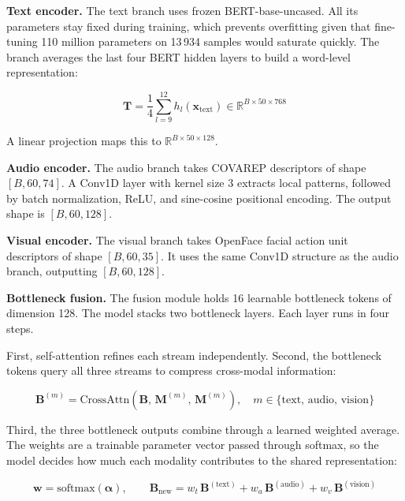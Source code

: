 

\textbf{Text encoder.} The text branch uses frozen BERT-base-uncased. All its parameters stay fixed during training, which prevents overfitting given that fine-tuning 110 million parameters on 13\,934 samples would saturate quickly. The branch averages the last four BERT hidden layers to build a word-level representation:

\begin{equation}
\mathbf{T} = \frac{1}{4} \sum_{l=9}^{12} h_l(\mathbf{x}_{\text{text}}) \in \mathbb{R}^{B \times 50 \times 768}
\end{equation}

A linear projection maps this to $\mathbb{R}^{B \times 50 \times 128}$.

\textbf{Audio encoder.} The audio branch takes COVAREP descriptors of shape $[B, 60, 74]$. A Conv1D layer with kernel size 3 extracts local patterns, followed by batch normalization, ReLU, and sine-cosine positional encoding. The output shape is $[B, 60, 128]$.

\textbf{Visual encoder.} The visual branch takes OpenFace facial action unit descriptors of shape $[B, 60, 35]$. It uses the same Conv1D structure as the audio branch, outputting $[B, 60, 128]$.

\textbf{Bottleneck fusion.} The fusion module holds 16 learnable bottleneck tokens of dimension 128. The model stacks two bottleneck layers. Each layer runs in four steps.

First, self-attention refines each stream independently. Second, the bottleneck tokens query all three streams to compress cross-modal information:

\begin{equation}
\mathbf{B}^{(m)} = \text{CrossAttn}(\mathbf{B},\, \mathbf{M}^{(m)},\, \mathbf{M}^{(m)}), \quad m \in \{\text{text, audio, vision}\}
\end{equation}

Third, the three bottleneck outputs combine through a learned weighted average. The weights are a trainable parameter vector passed through softmax, so the model decides how much each modality contributes to the shared representation:

\begin{equation}
\mathbf{w} = \text{softmax}(\boldsymbol{\alpha}), \qquad
\mathbf{B}_{\text{new}} = w_t\,\mathbf{B}^{(\text{text})} + w_a\,\mathbf{B}^{(\text{audio})} + w_v\,\mathbf{B}^{(\text{vision})}
\end{equation}

